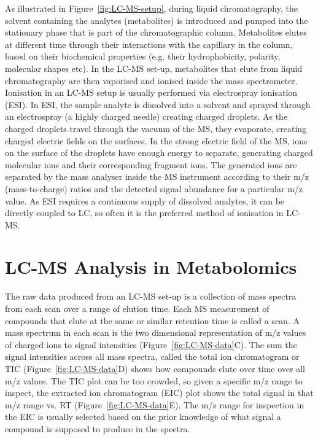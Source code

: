 As illustrated in Figure~\ref{fig:LC-MS-setup}, during liquid chromatography, the solvent containing the analytes (metabolites) is introduced and pumped into the stationary phase that is part of the chromatographic column. Metabolites elutes at different time through their interactions with the capillary in the column, based on their biochemical properties (e.g. their hydrophobicity, polarity, molecular shapes etc). In the LC-MS set-up, metabolites that elute from liquid chromatography are then vaporised and ionised inside the mass spectrometer. Ionisation in an LC-MS setup is usually performed via electrospray ionisation (ESI). In ESI, the sample analyte is dissolved into a solvent and sprayed through an electrospray (a highly charged needle) creating charged droplets. As the charged droplets travel through the vacuum of the MS, they evaporate, creating charged electric fields on the surfaces. In the strong electric field of the MS, ions on the surface of the droplets have enough energy to separate, generating charged molecular ions and their corresponding fragment ions. The generated ions are separated by the mass analyser inside the MS instrument according to their m/z (mass-to-charge) ratios and the detected signal abundance for a particular m/z value. As ESI requires a continuous supply of dissolved analytes, it can be directly coupled to LC, so often it is the preferred method of ionisation in LC-MS. 

\section{LC-MS Analysis in Metabolomics}

The raw data produced from an LC-MS set-up is a collection of mass spectra from each scan over a range of elution time. Each MS measurement of compounds that elute at the same or similar retention time is called a scan. A mass spectrum in each scan is the two dimensional representation of m/z values of charged ions to signal intensities (Figure~\ref{fig:LC-MS-data}C). The sum the signal intensities across all mass spectra, called the total ion chromatogram or TIC (Figure~\ref{fig:LC-MS-data}D) shows how compounds elute over time over all m/z values. The TIC plot can be too crowded, so given a specific m/z range to inspect, the extracted ion chromatogram (EIC) plot shows the total signal in that m/z range vs. RT (Figure~\ref{fig:LC-MS-data}E). The m/z range for inspection in the EIC is usually selected based on the prior knowledge of what signal a compound is supposed to produce in the spectra.

